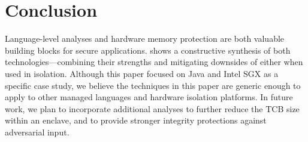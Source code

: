 \section{Conclusion}
\label{sec:conclusion}

Language-level analyses and hardware memory protection are both valuable
building blocks for secure applications.
\systemname{} shows a constructive synthesis of both technologies---combining their strengths
and mitigating downsides of either when used in isolation.
Although this paper focused on Java and Intel SGX as a specific case study,
we believe the techniques in this paper are generic enough to apply to
other managed languages and hardware isolation platforms.
In future work, we plan to incorporate additional analyses
to further reduce the TCB size within an enclave, and to provide
stronger integrity protections against adversarial input.


